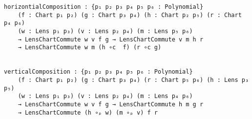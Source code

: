 \begin{verbatim}
horizontialComposition : {p₁ p₂ p₃ p₄ p₅ p₆ : Polynomial}
    (f : Chart p₁ p₂) (g : Chart p₃ p₄) (h : Chart p₂ p₅) (r : Chart p₄ p₆)
    (w : Lens p₁ p₃) (v : Lens p₂ p₄) (m : Lens p₅ p₆)
    → LensChartCommute w v f g → LensChartCommute v m h r
    → LensChartCommute w m (h ∘c  f) (r ∘c g)


verticalComposition : {p₁ p₂ p₃ p₄ p₅ p₆ : Polynomial}
    (f : Chart p₁ p₂) (g : Chart p₃ p₄) (r : Chart p₅ p₆) (h : Lens p₃ p₅)
    (w : Lens p₁ p₃) (v : Lens p₂ p₄) (m : Lens p₄ p₆)
    → LensChartCommute w v f g → LensChartCommute h m g r
    → LensChartCommute (h ∘ₚ w) (m ∘ₚ v) f r
\end{verbatim}


